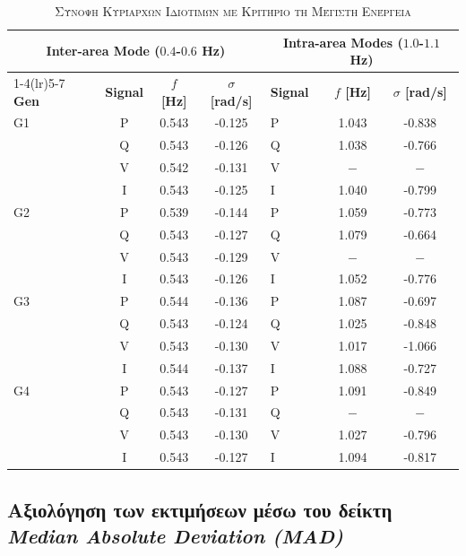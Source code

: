 \documentclass[conference]{IEEEtran}
\begin{document}
\begin{table}[h]
\centering
\caption{\textsc{Σύνοψη Κυρίαρχων Ιδιοτιμών με Κριτήριο τη Μέγιστη Ενέργεια}}
\label{tab:summary_modes}
\scriptsize
\setlength{\tabcolsep}{5pt}
\renewcommand{\arraystretch}{1.15}
\begin{tabular}{lccc | lcc}
\toprule
\multicolumn{4}{c}{\textbf{Inter-area Mode ($0.4$-$0.6$ Hz)}} & \multicolumn{3}{c}{\textbf{Intra-area Modes ($1.0$-$1.1$ Hz)}} \\
\cmidrule(lr){1-4}\cmidrule(lr){5-7}
\textbf{Gen} & \textbf{Signal} & \textbf{$f$ [Hz]} & \textbf{$\sigma$ [rad/s]} & \textbf{Signal} & \textbf{$f$ [Hz]} & \textbf{$\sigma$ [rad/s]} \\
\midrule
    G1 & P & 0.543 & -0.125 & P & 1.043 & -0.838 \\
    & Q & 0.543 & -0.126 & Q & 1.038 & -0.766 \\
    & V & 0.542 & -0.131 & V & $-$ & $-$ \\
    & I & 0.543 & -0.125 & I & 1.040 & -0.799 \\
    \midrule
    G2 & P & 0.539 & -0.144 & P & 1.059 & -0.773 \\
    & Q & 0.543 & -0.127 & Q & 1.079 & -0.664 \\
    & V & 0.543 & -0.129 & V & $-$ & $-$ \\
    & I & 0.543 & -0.126 & I & 1.052 & -0.776 \\
    \midrule
    G3 & P & 0.544 & -0.136 & P & 1.087 & -0.697 \\
    & Q & 0.543 & -0.124 & Q & 1.025 & -0.848 \\
    & V & 0.543 & -0.130 & V & 1.017 & -1.066 \\
    & I & 0.544 & -0.137 & I & 1.088 & -0.727 \\
    \midrule
    G4 & P & 0.543 & -0.127 & P & 1.091 & -0.849 \\
    & Q & 0.543 & -0.131 & Q & $-$ & $-$ \\
    & V & 0.543 & -0.130 & V & 1.027 & -0.796 \\
    & I & 0.543 & -0.127 & I & 1.094 & -0.817 \\
\bottomrule
\end{tabular}
\end{table}

\subsection{Αξιολόγηση των εκτιμήσεων μέσω του δείκτη \textit{Median Absolute Deviation (MAD)}}
\label{subsec:mad_evaluation}
\end{document}
